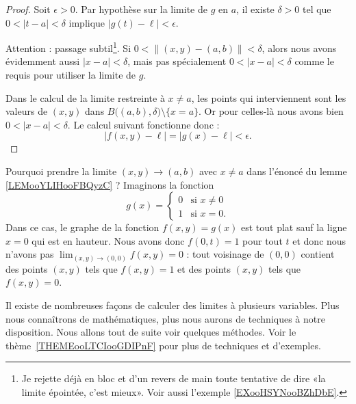 \begin{proof}
    Soit \( \epsilon>0\). Par hypothèse sur la limite de \( g\) en \( a\), il existe \( \delta>0\) tel que \( 0<| t-a |<\delta\) implique \( | g(t)-\ell |<\epsilon\).

    Attention : passage subtil\footnote{Je rejette déjà en bloc et d'un revers de main toute tentative de dire «la limite épointée, c'est mieux». Voir aussi l'exemple \ref{EXooHSYNooBZhDbE}.}.  Si \( 0<\| (x,y)-(a,b) \|<\delta\), alors nous avons évidemment aussi \( | x-a |<\delta\), mais pas spécialement \( 0<| x-a |<\delta\) comme le requis pour utiliser la limite de \( g\).
    
    Dans le calcul de la limite restreinte à \( x\neq a\), les points qui interviennent sont les valeurs de \( (x,y)\) dans \( B\big( (a,b),\delta \big)\setminus\{ x=a \}\). Or pour celles-là nous avons bien \( 0<| x-a |<\delta\). Le calcul suivant fonctionne donc :
    \begin{equation}
        | f(x,y)-\ell |=| g(x)-\ell |<\epsilon.
    \end{equation}
\end{proof}

\begin{example}     \label{EXooHSYNooBZhDbE}
    Pourquoi prendre la limite \( (x,y)\to (a,b)\) avec \( x\neq a\) dans l'énoncé du lemme \ref{LEMooYLIHooFBQyzC} ? Imaginons la fonction
    \begin{equation}
        g(x)=\begin{cases}
            0    &   \text{si } x\neq 0\\
            1    &    \text{si } x=0.
        \end{cases}
    \end{equation}
    Dans ce cas, le graphe de la fonction \( f(x,y)=g(x)\) est tout plat sauf la ligne \( x=0\) qui est en hauteur. Nous avons donc \( f(0,t)=1\) pour tout \( t\) et donc nous n'avons pas \( \lim_{(x,y)\to (0,0)} f(x,y)=0\) :  tout voisinage de \( (0,0)\) contient des points \( (x,y)\) tels que \( f(x,y)=1\) et des points \( (x,y)\) tels que \( f(x,y)=0\).
\end{example}

Il existe de nombreuses façons de calculer des limites à plusieurs variables. Plus nous connaîtrons de mathématiques, plus nous aurons de techniques à notre disposition. Nous allons tout de suite voir quelques méthodes. Voir le thème~\ref{THEMEooLTCIooGDIPnF} pour plus de techniques et d'exemples.

